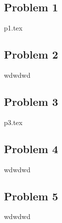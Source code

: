 \documentclass[a4paper]{article}
\begin{document}
    \subsection{Problem 1}\label{subsec:problem-1}
    {p1.tex}

    \subsection{Problem 2}\label{subsec:problem-2}
    wdwdwd

    \subsection{Problem 3}\label{subsec:problem-3}
    {p3.tex}

    \subsection{Problem 4}\label{subsec:problem-4}
    wdwdwd

    \subsection{Problem 5}
    wdwdwd
\end{document}
